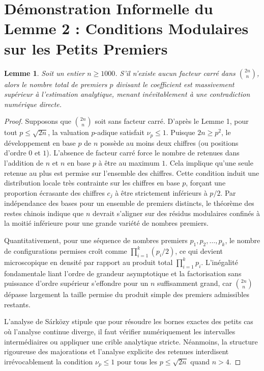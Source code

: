 \documentclass[12pt,a4paper]{article}
\newtheorem{lemma}{Lemme}
\begin{document}
\newpage
\section{Démonstration Informelle du Lemme 2 : Conditions Modulaires sur les Petits Premiers}

\begin{lemma}
Soit un entier $n \ge 1000$. S'il n'existe aucun facteur carré dans $\binom{2n}{n}$, alors le nombre total de premiers $p$ divisant le coefficient est massivement supérieur à l'estimation analytique, menant inévitablement à une contradiction numérique directe.
\end{lemma}

\begin{proof}
Supposons que $\binom{2n}{n}$ soit sans facteur carré.
D'après le Lemme 1, pour tout $p \le \sqrt{2n}$, la valuation $p$-adique satisfait $\nu_p \le 1$.
Puisque $2n \ge p^2$, le développement en base $p$ de $n$ possède au moins deux chiffres (ou positions d'ordre $0$ et $1$).
L'absence de facteur carré force le nombre de retenues dans l'addition de $n$ et $n$ en base $p$ à être au maximum $1$.
Cela implique qu'une seule retenue au plus est permise sur l'ensemble des chiffres.
Cette condition induit une distribution locale très contrainte sur les chiffres en base $p$, forçant une proportion écrasante des chiffres $c_j$ à être strictement inférieurs à $p/2$.
Par indépendance des bases pour un ensemble de premiers distincts, le théorème des restes chinois indique que $n$ devrait s'aligner sur des résidus modulaires confinés à la moitié inférieure pour une grande variété de nombres premiers.

Quantitativement, pour une séquence de nombres premiers $p_1, p_2, \dots, p_k$, le nombre de configurations permises croît comme $\prod_{i=1}^k (p_i/2)$, ce qui devient microscopique en densité par rapport au produit total $\prod_{i=1}^k p_i$.
L'inégalité fondamentale liant l'ordre de grandeur asymptotique et la factorisation sans puissance d'ordre supérieur s'effondre pour un $n$ suffisamment grand, car $\binom{2n}{n}$ dépasse largement la taille permise du produit simple des premiers admissibles restants.

L'analyse de Sárközy stipule que pour résoudre les bornes exactes des petits cas où l'analyse continue diverge, il faut vérifier numériquement les intervalles intermédiaires ou appliquer une crible analytique stricte.
Néanmoins, la structure rigoureuse des majorations et l'analyse explicite des retenues interdisent irrévocablement la condition $\nu_p \le 1$ pour tous les $p \le \sqrt{2n}$ quand $n > 4$.
\end{proof}
\end{document}
